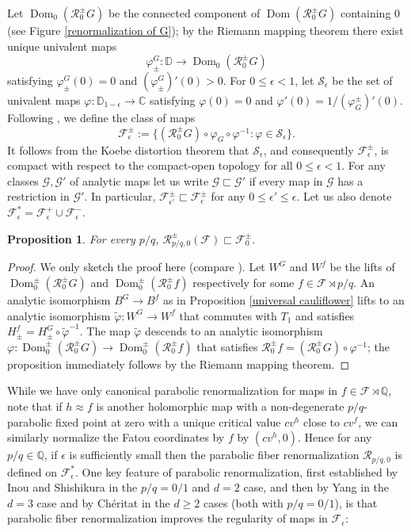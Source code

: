 \documentclass[12pt,letterpaper]{amsart}
\numberwithin{equation}{section}
\newtheorem{proposition}[equation]{Proposition}
\theoremstyle{remark}
\theoremstyle{definition}
\newcommand{\Q}{\mathbb Q}
\newcommand{\FF}{\mathcal F}
\newcommand{\RR}{\mathcal R}
\DeclareMathOperator{\Dom}{Dom}
\begin{document}
	Let $\Dom_0(\mathcal{R}_{0}^\pm G)$ be the connected component of $\Dom(\mathcal{R}_{ 0}^\pm G)$ containing $0$ (see Figure \ref{renormalization of G}); by the Riemann mapping theorem there exist unique univalent maps $$\varphi_\pm^G: \mathbb{D}\to \Dom_0(\mathcal{R}_{0}^\pm G)$$ satisfying $\varphi^G_\pm(0) = 0$ and $(\varphi_\pm^G)'(0) >0.$
	For $0 \leq \epsilon < 1$, let $\mathcal{S}_\epsilon$ be the set of univalent maps $\varphi:\mathbb{D}_{1-\epsilon}\to \mathbb{C}$ satisfying $\varphi(0) =0$ and $\varphi'(0)=1/ (\varphi_G^\pm)'(0) $. Following \cite{Cheritat22}, we define the class of maps 
	$$\mathcal{F}_\epsilon^\pm:= \{(\mathcal{R}_{0}^\pm G)\circ \varphi_G\circ \varphi^{-1}: \varphi\in \mathcal{S}_\epsilon\}.$$
	It follows from the Koebe distortion theorem that $\mathcal{S}_\epsilon$, and consequently $\mathcal{F}_\epsilon^\pm$, is compact with respect to the compact-open topology for all $0 \leq \epsilon < 1$. For any classes  $\mathcal{G}, \mathcal{G}'$ of analytic maps let us write $\mathcal{G}\sqsubset \mathcal{G}'$ if every map in $\mathcal{G}$ has a restriction in $\mathcal{G}'$. In particular, $\mathcal{F}_{\epsilon'}^\pm\sqsubset \mathcal{F}_{\epsilon}^\pm$ for any $0 \leq \epsilon' \leq \epsilon$.
	Let us also denote $\FF_\epsilon^* = \FF_\epsilon^+\cup \FF_\epsilon^-$.
	
	
	\begin{proposition}\label{weak parabolic invariance}
		For every $p/q$, $\mathcal{R}_{p/q, 0}^\pm(\mathcal{F})\sqsubset \mathcal{F}_0^\pm$.
	\end{proposition}
	
	\begin{proof}
		We only sketch the proof here (compare \cite[Theorem 13]{Cheritat22}).
		Let  $W^G$ and $W^f$ be the lifts of $\Dom_0^\pm(\RR_0^\pm G)$ and $\Dom_0^\pm(\RR_0^\pm f)$ respectively for  some $f\in \FF\rtimes p/q$. 
		An analytic isomorphism $B^G\to B^f$ as in Proposition \ref{universal cauliflower} lifts to an analytic isomorphism $\tilde\varphi: W^G\to W^f$ that commutes with $T_1$ and satisfies $H_\pm^f= H_\pm^G \circ \tilde \varphi^{-1}$.
		The map $\tilde \varphi$ descends to an analytic isomorphism $\varphi: \Dom_0^\pm(\RR_0^\pm G)\to \Dom_0^\pm(\RR_0^\pm f)$ that satisfies $\RR_0^\pm f = (\RR_0^\pm G )\circ \varphi^{-1}$; the proposition immediately follows by the Riemann mapping theorem.
	\end{proof}
	
	
	While we have only canonical parabolic renormalization for maps in $f\in \FF\rtimes \Q$, note that if $h\approx f$ is another holomorphic map with a non-degenerate $p/q$-parabolic fixed point at zero with a unique critical value $cv^h$ close to $cv^f$, we can similarly normalize the Fatou coordinates by $f$ by $(cv^h, 0).$ 
	Hence for any $p/q\in \Q$, if $\epsilon$ is sufficiently small then the parabolic fiber renormalization $\RR_{p/q, 0}$ is defined on $\FF_\epsilon^*$. One key feature of parabolic renormalization, first established by Inou and Shishikura \cite{shishikura} in the $p/q=0/1$ and $d= 2$ case, and then by Yang \cite{Yang}  in the $d= 3$ case and by Ch\'eritat \cite{Cheritat22} in the $d\geq 2$ cases (both with $p/q=0/1$), is that parabolic  fiber renormalization improves the regularity of maps in $\FF_\epsilon$:
	
\end{document}
